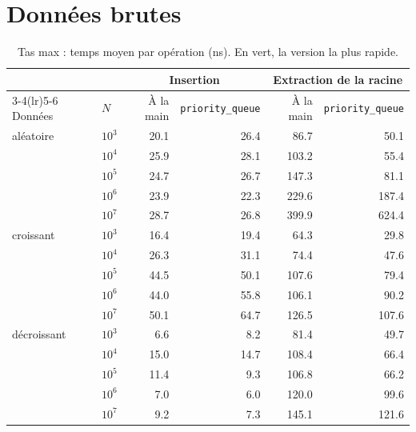 \documentclass[12pt,a4paper]{report}
\begin{document}
\section{Données brutes}
\begin{table}[H]
\centering
\caption{Tas max : temps moyen par opération (ns). En vert, la version la plus rapide.}
\newcommand{\g}{\cellcolor{ok}}
\begin{tabular}{llrrrr}
  \toprule
  & & \multicolumn{2}{c}{Insertion} & \multicolumn{2}{c}{Extraction de la racine} \\
  \cmidrule(lr){3-4}\cmidrule(lr){5-6}
  Données & $N$ & À la main & \texttt{priority\_queue} & À la main & \texttt{priority\_queue} \\
  \midrule
  aléatoire & $10^3$ & \g 20.1 & 26.4 & 86.7  & \g 50.1 \\
            & $10^4$ & \g 25.9 & 28.1 & 103.2 & \g 55.4 \\
            & $10^5$ & \g 24.7 & 26.7 & 147.3 & \g 81.1 \\
            & $10^6$ & 23.9 & \g 22.3 & 229.6 & \g 187.4 \\
            & $10^7$ & 28.7 & \g 26.8 & \g 399.9 & 624.4 \\
  \midrule
  croissant & $10^3$ & \g 16.4 & 19.4 & 64.3  & \g 29.8 \\
            & $10^4$ & \g 26.3 & 31.1 & 74.4  & \g 47.6 \\
            & $10^5$ & \g 44.5 & 50.1 & 107.6 & \g 79.4 \\
            & $10^6$ & \g 44.0 & 55.8 & 106.1 & \g 90.2 \\
            & $10^7$ & \g 50.1 & 64.7 & 126.5 & \g 107.6 \\
  \midrule
  décroissant & $10^3$ & \g 6.6 & 8.2  & 81.4  & \g 49.7 \\
              & $10^4$ & 15.0 & \g 14.7 & 108.4 & \g 66.4 \\
              & $10^5$ & 11.4 & \g 9.3  & 106.8 & \g 66.2 \\
              & $10^6$ & 7.0  & \g 6.0  & 120.0 & \g 99.6 \\
              & $10^7$ & 9.2  & \g 7.3  & 145.1 & \g 121.6 \\
  \bottomrule
\end{tabular}
\end{table}
\end{document}
